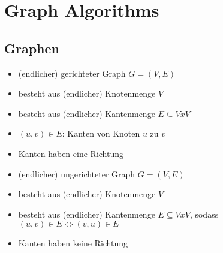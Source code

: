 \documentclass[
    ngerman,
    color=3b,
    dark_mode,
    load_common, %
    summary,
    boxarc,
]{rubos-tuda-template}
\begin{document}
\section{Graph Algorithms}
\subsection{Graphen}
\begin{definition}\mbox{}
    \begin{itemize}
        \item (endlicher) gerichteter Graph $G = (V,E)$
        \item besteht aus (endlicher) Knotenmenge $V$
        \item besteht aus (endlicher) Kantenmenge $E \subseteq V x V$
        \item $(u,v) \in E$: Kanten von Knoten $u$ zu $v$
        \item Kanten haben eine Richtung
    \end{itemize}
\end{definition}

\begin{definition}\mbox{}
    \begin{itemize}
        \item (endlicher) ungerichteter Graph $G = (V,E)$
        \item besteht aus (endlicher) Knotenmenge $V$
        \item besteht aus (endlicher) Kantenmenge $E \subseteq V x V$, sodass $(u,v) \in E \Leftrightarrow (v,u) \in E$
        \item Kanten haben keine Richtung
    \end{itemize}
\end{definition}
\end{document}
